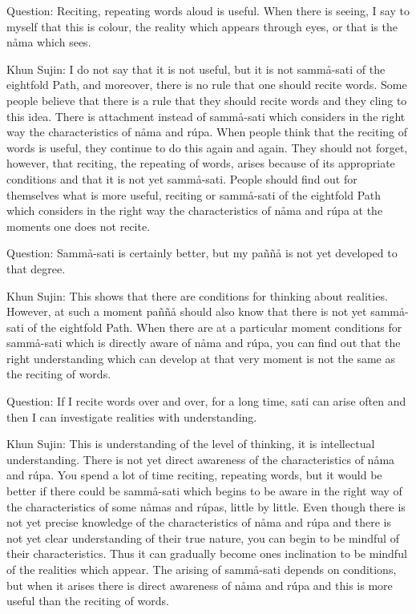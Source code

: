 \documentclass[12pt,twoside]{article}
\begin{document}
Question: Reciting, repeating words aloud is useful. When there is
seeing, I say to myself that this is colour, the reality which appears
through eyes, or that is the n{\aa}ma which sees. 

Khun Sujin: I do not say that it is not useful, but it is not
samm{\aa}{}-sati of the eightfold Path, and moreover, there is no rule
that one should recite words. Some people believe that there is a rule
that they should recite words and they cling to this idea. There is
attachment instead of samm{\aa}{}-sati which considers in the right way
the characteristics of n{\aa}ma and r\'upa. When people think that the
reciting of words is useful, they continue to do this again and again.
They should not forget, however, that reciting, the repeating of words,
arises because of its appropriate conditions and that it is not yet
samm{\aa}{}-sati. People should find out for themselves what is more
useful, reciting or samm{\aa}{}-sati of the eightfold Path which
considers in the right way the characteristics of n{\aa}ma and r\'upa
at the moments one does not recite. 

Question: Samm{\aa}{}-sati is certainly better, but my pa\~n\~n{\aa} is
not yet developed to that degree. 

Khun Sujin: This shows that there are conditions for thinking about
realities. However, at such a moment pa\~n\~n{\aa} should also know
that there is not yet samm{\aa}{}-sati of the eightfold Path. When
there are at a particular moment conditions for samm{\aa}{}-sati which
is directly aware of n{\aa}ma and r\'upa, you can find out that the
right understanding which can develop at that very moment is not the
same as the reciting of words. 

Question: If I recite words over and over, for a long time, sati can
arise often and then I can investigate realities with understanding. 

Khun Sujin: This is understanding of the level of thinking, it is
intellectual understanding. There is not yet direct awareness of the
characteristics of n{\aa}ma and r\'upa. You spend a lot of time
reciting, repeating words, but it would be better if there could be
samm{\aa}{}-sati which begins to be aware in the right way of the
characteristics of some n{\aa}mas and r\'upas, little by little. Even
though there is not yet precise knowledge of the characteristics of
n{\aa}ma and r\'upa and there is not yet clear understanding of their
true nature, you can begin to be mindful of their characteristics. Thus
it can gradually become one{\textquotesingle}s inclination to be
mindful of the realities which appear. The arising of samm{\aa}{}-sati
depends on conditions, but when it arises there is direct awareness of
n{\aa}ma and r\'upa and this is more useful than the reciting of words.
\end{document}
